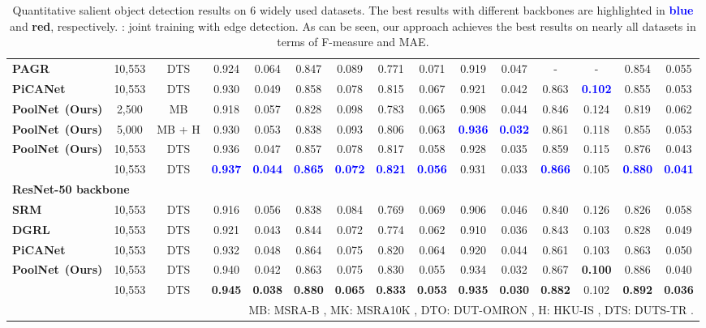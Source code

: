 \documentclass[10pt,twocolumn,letterpaper]{article}
\newcommand{\sorb}[1]{{\textcolor[rgb]{0.72,0.00,0.00}{\textbf{#1}}}}
\newcommand{\sobb}[1]{{\textcolor{blue}{\textbf{#1}}}}
\begin{document}
\begin{table*}[tp!]
\begin{tabular}{lcccccccccccccc}
  \textbf{PAGR}~\cite{zhang2018progressive} & 10,553 & DTS & 0.924 & 0.064 & 0.847 & 0.089 & 0.771 & 0.071 & 0.919 & 0.047 & - & - & 0.854 & 0.055 \\
  \textbf{PiCANet}~\cite{liu2018picanet} & 10,553 & DTS & 0.930 & 0.049 & 0.858 & 0.078 & 0.815 & 0.067 & 0.921 & 0.042 & 0.863 & \sobb{0.102} & 0.855 & 0.053 \\ \hline
\textbf{PoolNet}~\textbf{(Ours)} & 2,500 & MB & 0.918 & 0.057 & 0.828 & 0.098 & 0.783 & 0.065 & 0.908 & 0.044 & 0.846 & 0.124 & 0.819 & 0.062 \\
\textbf{PoolNet}~\textbf{(Ours)} & 5,000 & MB + H & 0.930 & 0.053 & 0.838 & 0.093 & 0.806 & 0.063 & \sobb{0.936} & \sobb{0.032} & 0.861 & 0.118 & 0.855 & 0.053 \\
\textbf{PoolNet}~\textbf{(Ours)} & 10,553 & DTS & 0.936 & 0.047 & 0.857 & 0.078 & 0.817 & 0.058 & 0.928 & 0.035 & 0.859 & 0.115 & 0.876 & 0.043 \\  & 10,553 & DTS & \sobb{0.937} & \sobb{0.044} & \sobb{0.865} & \sobb{0.072} & \sobb{0.821} & \sobb{0.056} & 0.931 & 0.033 & \sobb{0.866} & 0.105 & \sobb{0.880} & \sobb{0.041} \\
  \midrule[0.8pt]
  \multicolumn{15}{l}{\textbf{ResNet-50 backbone}} \\ \midrule[1pt]
  \textbf{SRM}~\cite{wang2017stagewise} & 10,553 & DTS & 0.916 & 0.056 & 0.838 & 0.084 & 0.769 & 0.069 & 0.906 & 0.046 & 0.840 & 0.126 & 0.826 & 0.058 \\
  \textbf{DGRL}~\cite{wang2018detect} & 10,553 & DTS & 0.921 & 0.043 & 0.844 & 0.072 & 0.774 & 0.062 & 0.910 & 0.036 & 0.843 & 0.103 & 0.828 & 0.049 \\
  \textbf{PiCANet}~\cite{liu2018picanet} & 10,553 & DTS & 0.932 & 0.048 & 0.864 & 0.075 & 0.820 & 0.064 & 0.920 & 0.044 & 0.861 & 0.103 & 0.863 & 0.050 \\ \hline

  \textbf{PoolNet}~\textbf{(Ours)} & 10,553 & DTS & 0.940 & 0.042 & 0.863 & 0.075 & 0.830 & 0.055 & 0.934 & 0.032 & 0.867 & \sorb{0.100} & 0.886 & 0.040 \\
 & 10,553 & DTS & \sorb{0.945} & \sorb{0.038} & \sorb{0.880} & \sorb{0.065} & \sorb{0.833} & \sorb{0.053} & \sorb{0.935} & \sorb{0.030} & \sorb{0.882} & 0.102 & \sorb{0.892} & \sorb{0.036} \\
  \bottomrule[1pt]
  \multicolumn{15}{r}{\scriptsize MB: MSRA-B \cite{liu2011learning}, MK: MSRA10K \cite{cheng2015global},
  DTO: DUT-OMRON \cite{yang2013saliency}, H: HKU-IS \cite{li2015visual}, DTS: DUTS-TR \cite{wang2017learning}.}
  \vspace{1pt}
  \end{tabular}
  \caption{Quantitative salient object detection results on 6 widely used datasets.
  The best results with different backbones are highlighted in \sobb{blue} and \sorb{red}, respectively.
  : joint training with edge detection.
  As can be seen, our approach achieves the best results on nearly all datasets in terms of F-measure and MAE.
  }\label{tab:results}
  \vspace{-8pt}
\end{table*}
\end{document}
